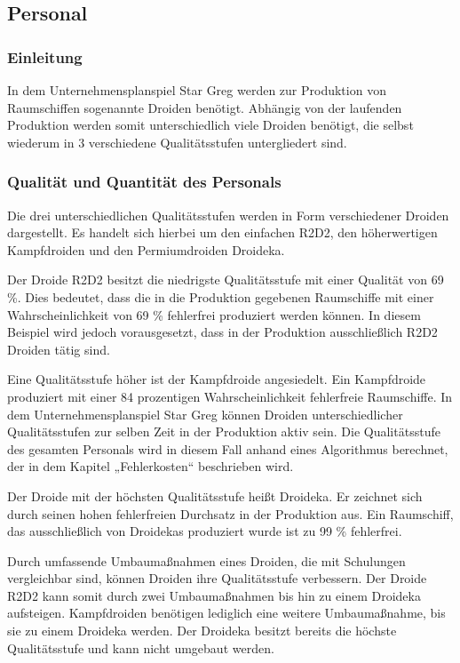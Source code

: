 \subsection{Personal}
\label{sub:Personal}
\subsubsection{Einleitung}
In dem Unternehmensplanspiel Star Greg werden zur Produktion von Raumschiffen sogenannte Droiden benötigt.   Abhängig von der laufenden Produktion  werden somit unterschiedlich viele Droiden benötigt, die selbst wiederum in 3 verschiedene Qualitätsstufen untergliedert sind.

\subsubsection{Qualität und Quantität des Personals}
Die drei unterschiedlichen Qualitätsstufen werden in Form verschiedener Droiden dargestellt. Es handelt sich hierbei um den einfachen R2D2, den höherwertigen Kampfdroiden und den Permiumdroiden Droideka.

Der Droide R2D2 besitzt die niedrigste Qualitätsstufe mit einer Qualität von 69 \%. Dies bedeutet, dass die in die Produktion gegebenen Raumschiffe mit einer Wahrscheinlichkeit von 69 \% fehlerfrei produziert werden können. In diesem Beispiel wird  jedoch vorausgesetzt, dass in der Produktion ausschließlich R2D2 Droiden tätig sind.  

Eine Qualitätsstufe höher ist der Kampfdroide angesiedelt. Ein Kampfdroide produziert mit einer 84 prozentigen Wahrscheinlichkeit fehlerfreie Raumschiffe. In dem Unternehmensplanspiel Star Greg können Droiden unterschiedlicher Qualitätsstufen zur selben Zeit in der Produktion aktiv sein. Die Qualitätsstufe des gesamten Personals wird in diesem Fall anhand eines Algorithmus berechnet, der in dem Kapitel „Fehlerkosten“ beschrieben wird.

Der Droide mit der höchsten Qualitätsstufe heißt Droideka. Er zeichnet sich durch seinen hohen fehlerfreien Durchsatz in der Produktion aus. Ein Raumschiff, das ausschließlich von Droidekas produziert wurde ist zu 99 \% fehlerfrei. 

Durch umfassende Umbaumaßnahmen eines Droiden, die mit Schulungen vergleichbar sind, können Droiden ihre Qualitätsstufe verbessern. Der Droide R2D2 kann somit durch zwei Umbaumaßnahmen bis hin zu einem Droideka aufsteigen.  Kampfdroiden benötigen lediglich eine weitere Umbaumaßnahme, bis sie zu einem Droideka werden. Der Droideka besitzt bereits die höchste Qualitätsstufe und kann nicht umgebaut werden.

